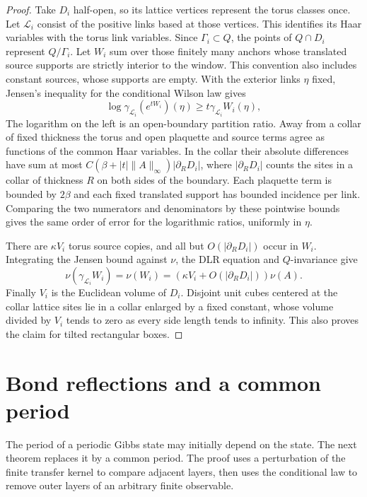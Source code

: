 \documentclass[11pt,letterpaper,reqno]{amsart}
\numberwithin{equation}{section}
\theoremstyle{definition}
\theoremstyle{remark}
\begin{document}
\begin{proof}
Take \(D_i\) half-open, so its lattice vertices represent the
torus classes once. Let \(\mathcal L_i\) consist of the positive
links based at those vertices. This identifies its Haar variables
with the torus link variables. Since \(\Gamma_i\subset Q\), the
points of \(Q\cap D_i\) represent \(Q/\Gamma_i\). Let \(W_i\)
sum over those finitely many anchors whose translated source
supports are strictly interior to the window. This convention
also includes constant sources, whose supports are empty.
With the exterior links \(\eta\) fixed, Jensen's inequality for
the conditional Wilson law gives
\[
 \log\gamma_{\mathcal L_i}(e^{tW_i})(\eta)
                        \ge t\gamma_{\mathcal L_i}W_i(\eta),
\]
The logarithm on the left is an open-boundary partition ratio.
Away from a collar of fixed thickness the torus and open
plaquette and source terms agree as functions of the common
Haar variables. In the collar their absolute differences have
sum at most \(C(\beta+|t|\|A\|_\infty)|\partial_R D_i|\), where
\(|\partial_R D_i|\) counts the sites in a collar of thickness
\(R\) on both sides of the boundary. Each plaquette term is
bounded by \(2\beta\) and each fixed translated support has
bounded incidence per link. Comparing the two numerators and
denominators by these pointwise bounds gives the same order of
error for the logarithmic ratios, uniformly in \(\eta\).

There are \(\kappa V_i\) torus source copies, and all but
\(O(|\partial_R D_i|)\) occur in \(W_i\).
Integrating the Jensen bound against \(\nu\), the DLR equation
and \(Q\)-invariance give
\[
 \nu(\gamma_{\mathcal L_i}W_i)=\nu(W_i)
       =(\kappa V_i+O(|\partial_R D_i|))\nu(A).
\]
Finally \(V_i\) is the Euclidean volume of \(D_i\).
Disjoint unit cubes centered at the collar lattice sites lie
in a collar enlarged by a fixed constant, whose volume divided
by \(V_i\) tends to zero as every side length tends to infinity.
This also proves the claim for tilted rectangular boxes.
\end{proof}

\section{Bond reflections and a common period}\label{lp:sec-link-symmetry}

The period of a periodic Gibbs state may initially depend on the state.
The next theorem replaces it by a common period. The proof uses a
perturbation of the finite transfer kernel to compare adjacent layers,
then uses the conditional law to remove outer layers of an arbitrary
finite observable.
\end{document}
